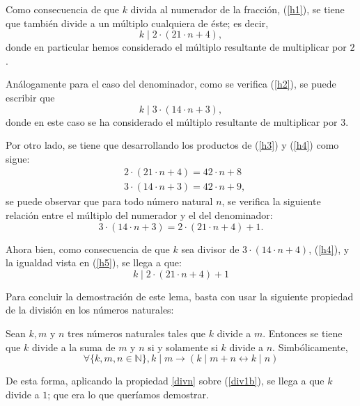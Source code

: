 \begin{demostracion}
  Como consecuencia de que \(k\) divida al numerador de la fracción,
  (\ref{h1}), se tiene que también divide a un múltiplo cualquiera de
  éste; es decir,
  \begin{equation}\label{h3}\tag{h3}
    k \mid 2⋅(21⋅n+4),
  \end{equation}
  donde en particular hemos considerado el múltiplo resultante de
  multiplicar por \(2\).

  Análogamente para el caso del denominador, como se verifica
  (\ref{h2}), se puede escribir que
  \begin{equation}\label{h4}\tag{h4}
    k \mid 3⋅(14⋅n+3),
  \end{equation}
  donde en este caso se ha considerado el múltiplo resultante de
  multiplicar por \(3\).

  Por otro lado, se tiene que desarrollando los productos de (\ref{h3})
  y (\ref{h4}) como sigue:
  \begin{align}
    & 2⋅(21⋅n+4)=42⋅n+8    \\
    & 3·(14·n+3)=42·n+9,
  \end{align}
  se puede observar que para todo número natural \(n\), se verifica la
  siguiente relación entre el múltiplo del numerador y el del
  denominador:
  \begin{equation}\label{h5}\tag{h5}
    3⋅(14⋅n+3)=2⋅(21⋅n+4)+1.
  \end{equation}

  Ahora bien, como consecuencia de que \(k\) sea divisor de
  \(3⋅(14⋅n+4)\), (\ref{h4}), y la igualdad vista en (\ref{h5}), se
  llega a que:
  \begin{equation}\label{div1b}
    k \mid 2⋅(21⋅n+4)+1
  \end{equation}

  Para concluir la demostración de este lema, basta con usar la
  siguiente propiedad de la división en los números naturales:

  \begin{proposicion}\label{divn}
    Sean \(k,m\) y \(n\) tres números naturales tales que \(k\) divide a
    \(m\). Entonces se tiene que \(k\) divide a la suma de \(m\) y \(n\)
    si y solamente si \(k\) divide a \(n\). Simbólicamente,
    \begin{equation}
      ∀ \{k, m, n ∈ ℕ\}, k ∣ m → (k ∣ m + n ↔ k ∣ n)
    \end{equation}
  \end{proposicion}

  De esta forma, aplicando la propiedad \ref{divn} sobre (\ref{div1b}),
  se llega a que \(k\) divide a \(1\); que era lo que queríamos
  demostrar.
\end{demostracion}

